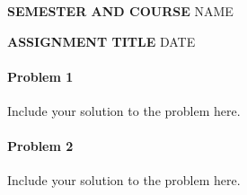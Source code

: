 \documentclass[11pt]{article}
\begin{document}
\noindent \textbf{SEMESTER AND COURSE} \hfill NAME

\noindent \textbf{ASSIGNMENT TITLE} \hfill DATE

\paragraph{Problem 1} Include your solution to the problem here.

\paragraph{Problem 2} Include your solution to the problem here.
\end{document}
